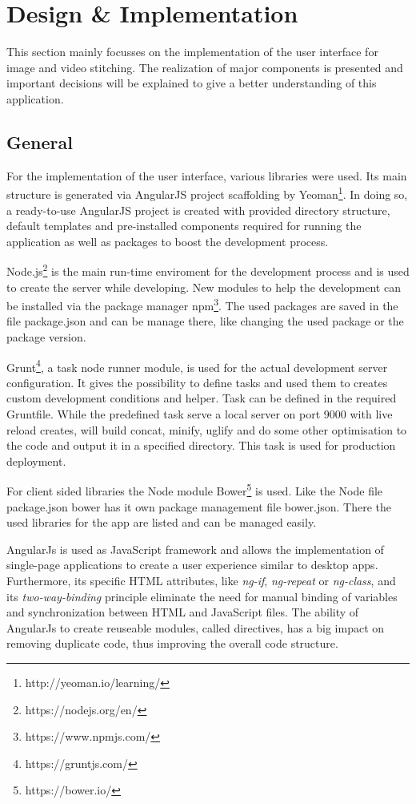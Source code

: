 \documentclass[conference]{IEEEtran}
\begin{document}
\section{Design \& Implementation}
This section mainly focusses on the implementation of the user interface for image and video stitching.
The realization of major components is presented and important decisions will be explained to give a better understanding of this application.

\subsection{General}
For the implementation of the user interface, various libraries were used.
Its main structure is generated via AngularJS project scaffolding by Yeoman\footnote{http://yeoman.io/learning/}.
In doing so, a ready-to-use AngularJS project is created with provided directory structure, default templates and pre-installed components required for running the application as well as packages to boost the development process.

Node.js\footnote{https://nodejs.org/en/} is the main run-time enviroment for the development process and is used to create the server while developing. New modules to help the development can be installed via the package manager npm\footnote{https://www.npmjs.com/}. The used packages are saved in the file package.json and can be manage there, like changing the used package or the package version.

Grunt\footnote{https://gruntjs.com/}, a task node runner module, is used for the actual development server configuration. It gives the possibility to define tasks and used them to creates custom development conditions and helper. Task can be defined in the required Gruntfile. While the predefined task serve a local server on port 9000 with live reload creates, will build concat, minify, uglify and do some other optimisation to the code and output it in a specified directory. This task is used for production deployment.

For client sided libraries the Node module Bower\footnote{https://bower.io/} is used. Like the Node file package.json bower has it own package management file bower.json. There the used libraries for the app are listed and can be managed easily. 

AngularJs is used as JavaScript framework and allows the implementation of single-page applications to create a user experience similar to desktop apps.
Furthermore, its specific HTML attributes, like \textit{ng-if}, \textit{ng-repeat} or \textit{ng-class}, and its \textit{two-way-binding} principle eliminate the need for manual binding of variables and synchronization between HTML and JavaScript files.
The ability of AngularJs to create reuseable modules, called directives, has a big impact on removing duplicate code, thus improving the overall code structure.
\end{document}
